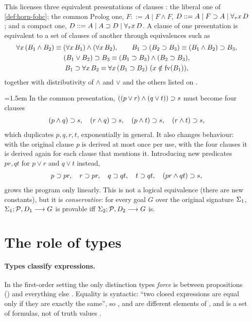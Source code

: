 This licenses three equivalent presentations of \fohc{} clauses : the liberal one of
\cref{def:horn-fohc}; the common Prolog one, $F ::= A\mid F\wedge F$, $D ::= A\mid F\supset A\mid\forall_\tau
x\,D$; and a compact one, $D ::= A\mid A\supset D\mid\forall_\tau x\,D$. A clause of one presentation is
equivalent to a set of clauses of another through equivalences such as
\begin{gather*}
\forall x\,(B_1\wedge B_2)\equiv(\forall x\,B_1)\wedge(\forall x\,B_2),\qquad
B_1\imp(B_2\imp B_3)\equiv(B_1\wedge B_2)\imp B_3,\\
(B_1\vee B_2)\imp B_3\equiv(B_1\imp B_3)\wedge(B_2\imp B_3),\\
B_1\imp\forall x\,B_2\equiv\forall x\,(B_1\imp B_2)\ (x\notin\operatorname{fv}(B_1)),
\end{gather*}
together with distributivity of $\wedge$ and $\vee$ and the others listed on .

\begin{example}\label{ex:horn-size}\emergencystretch=1.5em
In the common presentation, $((p\vee r)\wedge(q\vee t))\supset s$ must become four clauses
\[
(p\wedge q)\supset s,\quad (r\wedge q)\supset s,\quad (p\wedge t)\supset s,\quad (r\wedge t)\supset s,
\]
which duplicates $p, q, r, t$, exponentially in general. It also changes behaviour: with the original
clause $p$ is derived at most once per use, with the four clauses it is derived again for each clause
that mentions it. Introducing new predicates $pr, qt$ for $p\vee r$ and $q\vee t$ instead,
\[
p\supset pr,\quad r\supset pr,\quad q\supset qt,\quad t\supset qt,\quad (pr\wedge qt)\supset s,
\]
grows the program only linearly. This is not a logical equivalence (there are new constants), but it is
\emph{conservative}: for every goal $G$ over the original signature $\Sigma_1$,
$\Sigma_1;\mathcal{P},D_1\longrightarrow G$ is provable iff $\Sigma_2;\mathcal{P},D_2\longrightarrow G$ is.
\end{example}

\section{The role of types}\label{sec:horn-types}

\paragraph{Types classify expressions.} In the first-order setting the only distinction types
\emph{force} is between propositions () and everything else . Equality is syntactic: ``two
closed expressions are equal only if they are exactly the same'', so ,  and 
are different elements of , and  is a set of formulas, not of truth values
.

